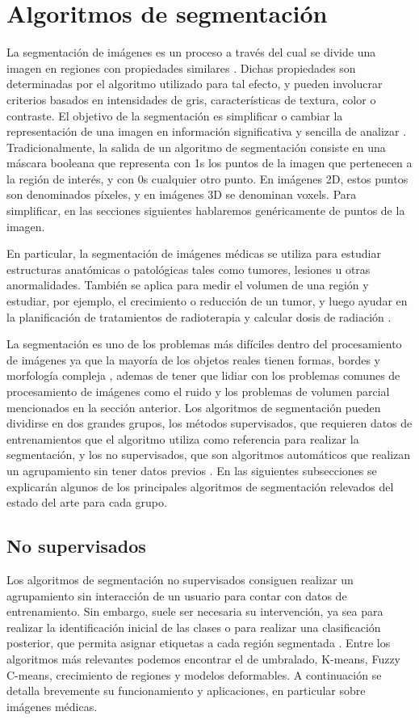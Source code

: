 \section{Algoritmos de segmentación}\label{section:algoritmos}
La segmentación de imágenes es un proceso a través del cual se divide una imagen en regiones con propiedades similares \citep{pham2000current}. Dichas propiedades son determinadas por el algoritmo utilizado para tal efecto, y pueden involucrar criterios basados en intensidades de gris, características de textura, color o contraste. El objetivo de la segmentación es simplificar o cambiar la representación de una imagen en información significativa y sencilla de analizar \citep{barghout2003perceptual}. Tradicionalmente, la salida de un algoritmo de segmentación consiste en una máscara booleana que representa con 1s los puntos de la imagen que pertenecen a la región de interés, y con 0s cualquier otro punto. En imágenes 2D, estos puntos son denominados píxeles, y en imágenes 3D se denominan voxels. Para simplificar, en las secciones siguientes hablaremos genéricamente de puntos de la imagen.

En particular, la segmentación de imágenes médicas se utiliza para estudiar estructuras anatómicas o patológicas tales como tumores, lesiones u otras anormalidades. También se aplica para medir el volumen de una región y estudiar, por ejemplo, el crecimiento o reducción de un tumor, y luego ayudar en la planificación de tratamientos de radioterapia y calcular dosis de radiación \citep{sharma2010automated}.

La segmentación es uno de los problemas más difíciles dentro del procesamiento de imágenes ya que la mayoría de los objetos reales tienen formas, bordes y morfología compleja \citep{wu2007segmentation}, ademas de tener que lidiar con los problemas comunes de procesamiento de imágenes como el ruido y los problemas de volumen parcial mencionados en la sección anterior. 
Los algoritmos de segmentación pueden dividirse en dos grandes grupos, los métodos supervisados, que requieren datos de entrenamientos que el algoritmo utiliza como referencia para realizar la segmentación, y los no supervisados, que son algoritmos automáticos que realizan un agrupamiento sin tener datos previos \citep{pham2000current}.
En las siguientes subsecciones se explicarán algunos de los principales algoritmos de segmentación relevados del estado del arte para cada grupo.

\subsection{No supervisados}
Los algoritmos de segmentación no supervisados consiguen realizar un agrupamiento sin interacción de un usuario para contar con datos de entrenamiento. Sin embargo, suele ser necesaria su intervención, ya sea para realizar la identificación inicial de las clases o para realizar una clasificación posterior, que permita asignar etiquetas a cada región segmentada \citep{clarke1995mri}.
Entre los algoritmos más relevantes podemos encontrar el de umbralado, K-means, Fuzzy C-means, crecimiento de regiones y modelos deformables. A continuación se detalla brevemente su funcionamiento y aplicaciones, en particular sobre imágenes médicas.

